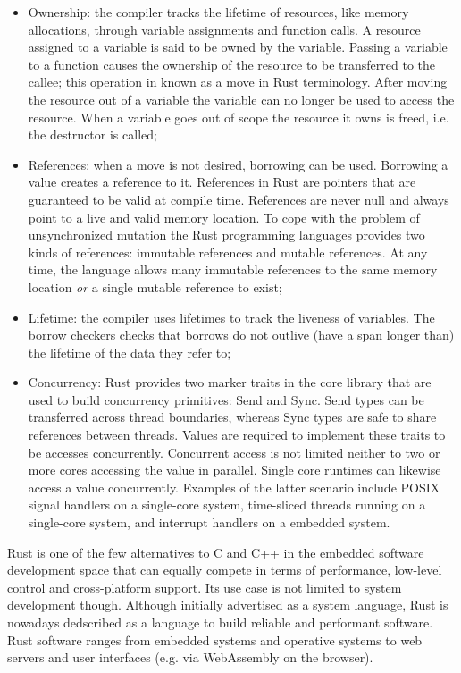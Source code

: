 \begin{itemize}
    \item Ownership: the compiler tracks the lifetime of resources, like memory allocations, through variable assignments and function calls. A resource assigned to a variable is said to be owned by the variable. Passing a variable to a function causes the ownership of the resource to be transferred to the callee; this operation in known as a move in Rust terminology. After moving the resource out of a variable the variable can no longer be used to access the resource. When a variable goes out of scope the resource it owns is freed, i.e. the destructor is called;
    \item References: when a move is not desired, borrowing can be used. Borrowing a value creates a reference to it. References in Rust are pointers that are guaranteed to be valid at compile time. References are never null and always point to a live and valid memory location. To cope with the problem of unsynchronized mutation the Rust programming languages provides two kinds of references: immutable references and mutable references. At any time, the language allows many immutable references to the same memory location \emph{or} a single mutable reference to exist;
    \item Lifetime: the compiler uses lifetimes to track the liveness of variables. The borrow checkers checks that borrows do not outlive (have a span longer than) the lifetime of the data they refer to;
    \item Concurrency: Rust provides two marker traits in the core library that are used to build concurrency primitives: Send and Sync. Send types can be transferred across thread boundaries, whereas Sync types are safe to share references between threads. Values are required to implement these traits to be accesses concurrently. Concurrent access is not limited neither to two or more cores accessing the value in parallel. Single core runtimes can likewise access a value concurrently. Examples of the latter scenario include POSIX signal handlers on a single-core system, time-sliced threads running on a single-core system, and interrupt handlers on a embedded system.
\end{itemize}

Rust is one of the few alternatives to C and C++ in the embedded software development space that can equally compete in terms of performance, low-level control and cross-platform support. Its use case is not limited to system development though. Although initially advertised as a system language, Rust is nowadays dedscribed as a language to build reliable and performant software. Rust software ranges from embedded systems and operative systems to web servers and user interfaces (e.g. via WebAssembly on the browser).


